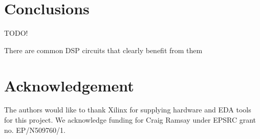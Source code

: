 \documentclass[conference]{IEEEtran}
\begin{document}
\section{Conclusions}

TODO!

There are common DSP circuits that clearly benefit from them

\section*{Acknowledgement}

The authors would like to thank Xilinx for supplying hardware and EDA tools for
this project. We acknowledge funding for Craig Ramsay under EPSRC grant no.
EP/N509760/1.


 
\end{document}
